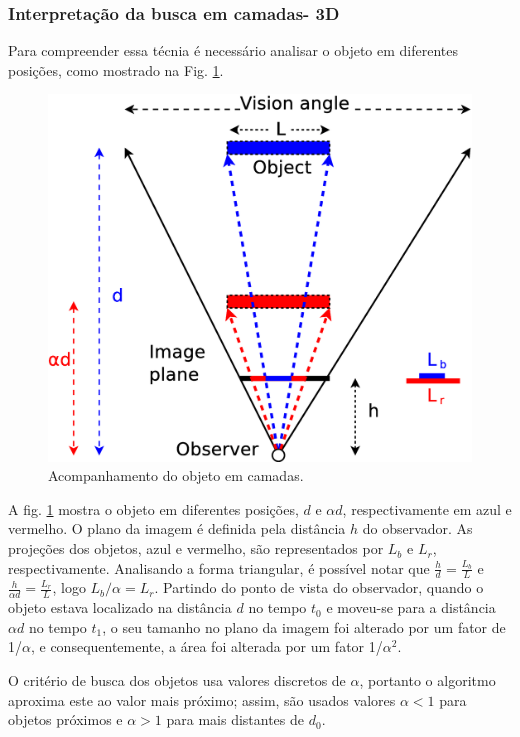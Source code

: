 

\subsubsection{Interpretação da busca em camadas- 3D}

Para compreender essa técnia é necessário analisar o objeto 
em diferentes posições, como mostrado na Fig. \ref{fig:multiscale3d}.

\begin{figure}[H]
\centering
  \includegraphics[width=.7\columnwidth]{images/Diagrama3.eps}
  \caption{ Acompanhamento do objeto em camadas.}
  \label{fig:multiscale3d}
\end{figure}

A fig. \ref{fig:multiscale3d} mostra o objeto em diferentes posições, 
$d$ e $\alpha d$, respectivamente em azul e vermelho.
O plano da imagem é definida pela distância $h$ do observador. As projeções dos objetos,
azul e vermelho, são representados por $L_b$ e $L_r$, respectivamente. Analisando a forma
triangular, é possível notar que $\frac{h}{d}=\frac{L_b}{L}$ e $\frac{h}{\alpha d}=\frac{L_r}{L}$, logo 
$L_b/\alpha= L_r$. 
Partindo do ponto de vista do observador, quando o objeto estava localizado na distância $d$ no tempo
$t_0$ e moveu-se para a distância $\alpha d$ no tempo $t_1$, o seu tamanho no plano da imagem 
foi alterado por um fator de 1/$\alpha$, e consequentemente, a área foi alterada por um fator 1/$\alpha^2$.

O critério de busca dos objetos usa valores discretos de $\alpha$, portanto o algoritmo aproxima este
ao valor mais próximo; assim, são usados valores $\alpha<1$
para objetos próximos e  $\alpha>1$ para mais distantes de $d_0$.



